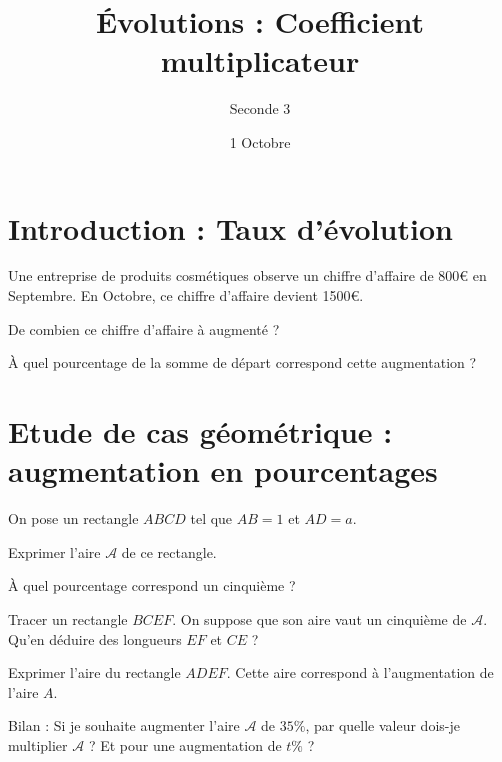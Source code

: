 \documentclass{exos}
\title{Évolutions : Coefficient multiplicateur}
\author{Seconde 3}
\date{1\ier{} Octobre}
\begin{document}
\maketitle

\section*{Introduction : Taux d'évolution}
\begin{exercize}
Une entreprise de produits cosmétiques observe un chiffre d'affaire de \num{800}€ en Septembre. En Octobre, ce chiffre d'affaire devient \num{1500}€.
\begin{alphaquestions}
\item De combien ce chiffre d'affaire à augmenté ?
\item À quel pourcentage de la somme de départ correspond cette augmentation ?
\end{alphaquestions} 
\end{exercize}
\section*{Etude de cas géométrique : augmentation en pourcentages}
\begin{exercize}
On pose un rectangle $ABCD$ tel que $AB = 1$ et $AD = a$.

\begin{center}
\end{center}

\begin{alphaquestions}
\item Exprimer l'aire $\mathcal{A}$ de ce rectangle.
\item À quel pourcentage correspond un cinquième ?
\item Tracer un rectangle $BCEF$. On suppose que son aire vaut un cinquième de $\mathcal{A}$. Qu'en déduire des longueurs $EF$ et $CE$ ?
\item Exprimer l'aire du rectangle $ADEF$. Cette aire correspond à l'augmentation de l'aire $A$.
\item Bilan : Si je souhaite augmenter l'aire $\mathcal{A}$ de $35\%$, par quelle valeur dois-je multiplier $\mathcal{A}$ ? Et pour une augmentation de $t\%$ ?
\end{alphaquestions}
\end{exercize}
\end{document}
